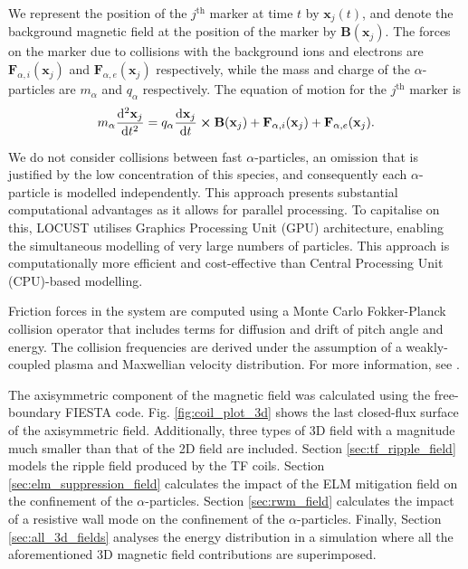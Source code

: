 \documentclass[10pt, a4paper, twoside]{article}
\begin{document}
We represent the position of the $j^{\text{th}}$ marker at time $t$ by $\mathbf{x}_j(t)$, and denote
the background magnetic field at the position of the marker by $\textbf{B}(\mathbf{x}_j)$.
The forces on the marker due to collisions with the background ions and electrons are $\textbf{F}_{\alpha,i}(\mathbf{x}_j)$ and $\textbf{F}_{\alpha,e}(\mathbf{x}_j)$ respectively, while the mass and charge of the $\alpha$-particles are $m_\alpha$ and $q_\alpha$ respectively. The equation of motion for the $j^{\text{th}}$ marker is
\begin{equation}
m_\alpha\dv[2]{\mathbf{x}_j}{t} = q_\alpha\dv{\mathbf{x}_j}{t}\cross\textbf{B}(\mathbf{x}_j) + \textbf{F}_{\alpha,i}(\mathbf{x}_j) + \textbf{F}_{\alpha,e}(\mathbf{x}_j).
\end{equation}

We do not consider collisions between fast $\alpha$-particles, an omission that is justified by the low concentration of this species, and consequently each $\alpha$-particle is modelled independently. This approach presents substantial computational advantages as it allows for parallel processing. To capitalise on this, LOCUST utilises Graphics Processing Unit (GPU) architecture, enabling the simultaneous modelling of very large numbers of particles. This approach is computationally more efficient and cost-effective than Central Processing Unit (CPU)-based modelling.

Friction forces in the system are computed using a Monte Carlo Fokker-Planck collision operator that includes terms for diffusion and drift of pitch angle and energy. The collision frequencies are derived under the assumption of a weakly-coupled plasma and Maxwellian velocity distribution. For more information, see \cite{ward2021}.

The axisymmetric component of the magnetic field was calculated using the free-boundary FIESTA code. Fig. \ref{fig:coil_plot_3d} shows the last closed-flux surface of the axisymmetric field. Additionally, three types of 3D field with a magnitude much smaller than that of the 2D field are included. Section \ref{sec:tf_ripple_field} models the ripple field produced by the TF coils. Section \ref{sec:elm_suppression_field} calculates the impact of the ELM mitigation field on the confinement of the $\alpha$-particles. Section \ref{sec:rwm_field} calculates the impact of a resistive wall mode on the confinement of the $\alpha$-particles. Finally, Section \ref{sec:all_3d_fields} analyses the energy distribution in a simulation where all the aforementioned 3D magnetic field contributions are superimposed.
\end{document}

